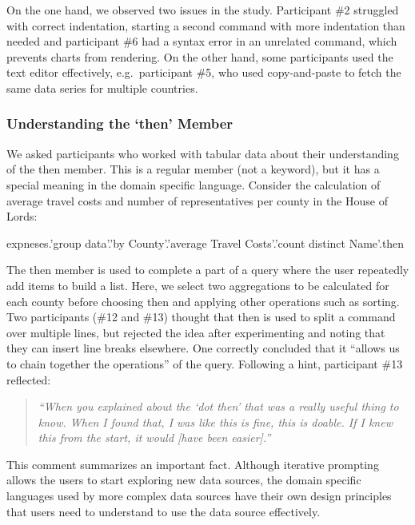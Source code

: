 \documentclass[manuscript,review,anonymous]{acmart}
\newcommand{\ikvd}[1]{{\fontfamily{zi4}\selectfont\small #1}}
\begin{document}
On the one hand, we observed two issues in the study. Participant \#2 struggled with correct indentation, starting
a second command with more indentation than needed and participant \#6 had a syntax error in an unrelated command,
which prevents charts from rendering. On the other hand, some participants used the text editor effectively,
e.g.~participant \#5, who used copy-and-paste to fetch the same data series for multiple countries.


\subsubsection*{Understanding the `then' Member}
We asked participants who worked with tabular data about their understanding of the \ikvd{then} member.
This is a regular member (not a keyword), but it has a special meaning in the domain specific language.
Consider the calculation of average travel costs and number of representatives per county in the House of Lords:

\begin{thegamma}
expneses.'group data'.'by County'.'average Travel Costs'.'count distinct Name'.then
\end{thegamma}

\noindent
The \ikvd{then} member is used to complete a part of a query where the user repeatedly
add items to build a list. Here, we select two aggregations to be calculated for each
county before choosing \ikvd{then} and applying other operations such as sorting.
Two participants (\#12 and \#13) thought that \ikvd{then} is used to split a command
over multiple lines, but rejected the idea after experimenting and noting that they can insert
line breaks elsewhere. One correctly concluded that it ``allows us to chain together the
operations'' of the query. Following a hint, participant \#13 reflected:

\begin{quote}
  \emph{``When you explained about the `dot then' that was a really useful thing to know.
  When I found that, I was like this is fine, this is doable. If I knew this from the start,
  it would [have been easier].''}
\end{quote}

\noindent
This comment summarizes an important fact. Although iterative prompting allows the users to start
exploring new data sources, the domain specific languages used by more complex data sources have
their own design principles that users need to understand to use the data source effectively.
\end{document}
